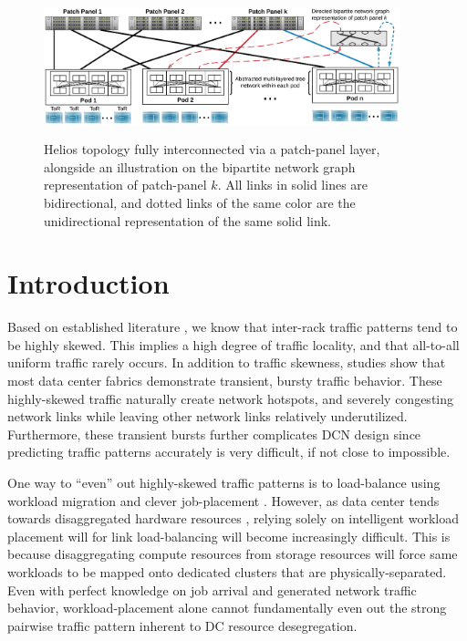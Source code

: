 \documentclass[sigconf]{acmart}
\theoremstyle{definition}
\begin{document}
\newcommand{\floor}[1]{\left\lfloor #1 \right\rfloor}
\newcommand{\ceil}[1]{\left\lceil #1 \right\rceil}

\begin{figure}[ht!]
\centering
\includegraphics[draft=false, height= 1.6in,trim={0.7cm 0.6cm 0.7cm 0.7cm}, width=0.92\textwidth]{figures/helios_v2}
\caption{Helios topology fully interconnected via a patch-panel layer, alongside an illustration on the bipartite network graph representation of patch-panel $k$. All links in solid lines are bidirectional, and dotted links of the same color are the unidirectional representation of the same solid link.}
\label{direct_connect_topology}
\end{figure}

\section{Introduction}

Based on established literature \cite{benson2010network, benson2009understanding}, we know that inter-rack traffic patterns tend to be highly skewed. This implies a high degree of traffic locality, and that all-to-all uniform traffic rarely occurs. In addition to traffic skewness, studies \cite{delimitrou2012echo} show that most data center fabrics demonstrate transient, bursty traffic behavior. These highly-skewed traffic naturally create network hotspots, and severely congesting network links while leaving other network links relatively underutilized. Furthermore, these transient bursts further complicates DCN design since predicting traffic patterns accurately is very difficult, if not close to impossible.

One way to ``even'' out highly-skewed traffic patterns is to load-balance using workload migration and clever job-placement \cite{jain2012topology}. However, as data center tends towards disaggregated hardware resources \cite{papaioannou2016benefits}, relying solely on intelligent workload placement will for link load-balancing will become increasingly difficult. This is because disaggregating compute resources from storage resources will force same workloads to be mapped onto dedicated clusters that are physically-separated. Even with perfect knowledge on job arrival and generated network traffic behavior, workload-placement alone cannot fundamentally even out the strong pairwise traffic pattern inherent to DC resource desegregation. \cite{reactor_liu2014}
\end{document}
